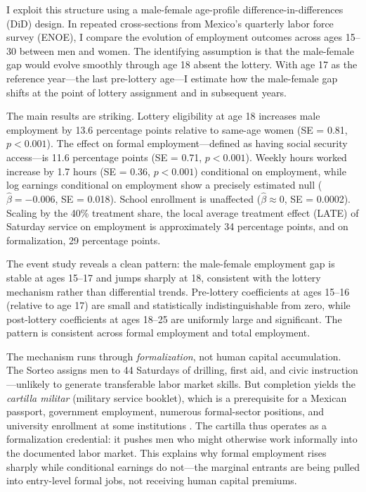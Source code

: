 \documentclass[12pt]{article}
\begin{document}
I exploit this structure using a male-female age-profile difference-in-differences (DiD) design. In repeated cross-sections from Mexico's quarterly labor force survey (ENOE), I compare the evolution of employment outcomes across ages 15--30 between men and women. The identifying assumption is that the male-female gap would evolve smoothly through age 18 absent the lottery. With age 17 as the reference year---the last pre-lottery age---I estimate how the male-female gap shifts at the point of lottery assignment and in subsequent years.

The main results are striking. Lottery eligibility at age 18 increases male employment by 13.6 percentage points relative to same-age women (SE = 0.81, $p < 0.001$). The effect on formal employment---defined as having social security access---is 11.6 percentage points (SE = 0.71, $p < 0.001$). Weekly hours worked increase by 1.7 hours (SE = 0.36, $p < 0.001$) conditional on employment, while log earnings conditional on employment show a precisely estimated null ($\hat{\beta} = -0.006$, SE = 0.018). School enrollment is unaffected ($\hat{\beta} \approx 0$, SE = 0.0002). Scaling by the 40\% treatment share, the local average treatment effect (LATE) of Saturday service on employment is approximately 34 percentage points, and on formalization, 29 percentage points.

The event study reveals a clean pattern: the male-female employment gap is stable at ages 15--17 and jumps sharply at 18, consistent with the lottery mechanism rather than differential trends. Pre-lottery coefficients at ages 15--16 (relative to age 17) are small and statistically indistinguishable from zero, while post-lottery coefficients at ages 18--25 are uniformly large and significant. The pattern is consistent across formal employment and total employment.

The mechanism runs through \textit{formalization}, not human capital accumulation. The Sorteo assigns men to 44 Saturdays of drilling, first aid, and civic instruction---unlikely to generate transferable labor market skills. But completion yields the \textit{cartilla militar} (military service booklet), which is a prerequisite for a Mexican passport, government employment, numerous formal-sector positions, and university enrollment at some institutions \citep{sedena2024}. The cartilla thus operates as a formalization credential: it pushes men who might otherwise work informally into the documented labor market. This explains why formal employment rises sharply while conditional earnings do not---the marginal entrants are being pulled into entry-level formal jobs, not receiving human capital premiums.
\end{document}
